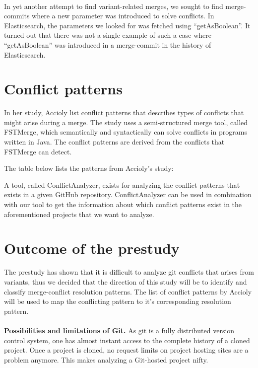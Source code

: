 \paragraph*{}
In yet another attempt to find variant-related merges, we sought to find merge-commits where a new parameter was introduced to solve conflicts. In Elasticsearch, the parameters we looked for was fetched using “getAsBoolean”. It turned out that there was not a single example of such a case where “getAsBoolean” was introduced in a merge-commit in the history of Elasticsearch.
\section{Conflict patterns}
In her study, Accioly list conflict patterns that describes types of conflicts that might arise during a merge. The study uses a semi-structured merge tool, called FSTMerge, which semantically and syntactically can solve conflicts in programs written in Java. The conflict patterns are derived from the conflicts that FSTMerge can detect.

The table below lists the patterns from Accioly’s study:

A tool, called ConflictAnalyzer, exists for analyzing the conflict patterns that exists in a given GitHub repository. ConflictAnalyzer can be used in combination with our tool to get the information about which conflict patterns exist in the aforementioned projects that we want to analyze.
\section{Outcome of the prestudy}
The prestudy has shown that it is difficult to analyze git conflicts that arises from variants, thus we decided that the direction of this study will be to identify and classify merge-conflict resolution patterns. The list of conflict patterns by Accioly will be used to map the conflicting pattern to it’s corresponding resolution pattern.
\paragraph*{}
\textbf{Possibilities and limitations of Git.} As git is a fully distributed version control system, one has almost instant access to the complete history of a cloned project. Once a project is cloned, no request limits on project hosting sites are a problem anymore. This makes analyzing a Git-hosted project nifty.
